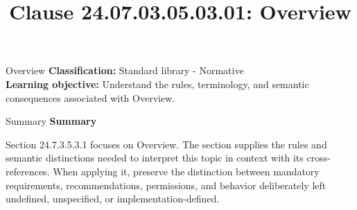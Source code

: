 \documentclass[10pt,letterpaper]{article}
\title{Clause 24.07.03.05.03.01: Overview}
\author{}
\date{}
\begin{document}
\maketitle
\begin{CornellOverviewBox}{Overview}
\textbf{Classification:} Standard library - Normative\\[2pt]
\textbf{Learning objective:} Understand the rules, terminology, and semantic consequences associated with Overview.
\end{CornellOverviewBox}\begin{CornellSummaryBox}{Summary}
{\sffamily\bfseries\color{Accent} Summary}\par\vspace{3pt}Section 24.7.3.5.3.1 focuses on Overview. The section supplies the rules and semantic distinctions needed to interpret this topic in context with its cross-references. When applying it, preserve the distinction between mandatory requirements, recommendations, permissions, and behavior deliberately left undefined, unspecified, or implementation-defined.
\end{CornellSummaryBox}
\end{document}
